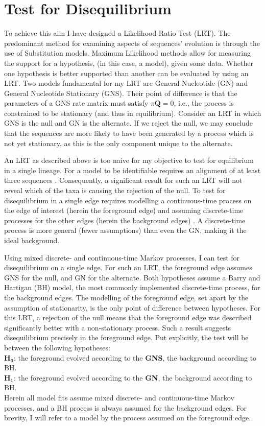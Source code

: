 
\chapter{Test for Disequilibrium}

To achieve this aim I have designed a Likelihood Ratio Test (LRT). The predominant method for examining aspects of sequences' evolution is through the use of \glspl{Substitution model}. \Gls{Maximum Likelihood} methods allow for measuring the support for a hypothesis, (in this case, a \gls{model}), given some data. Whether one hypothesis is better supported than another can be evaluated by using an LRT. Two models fundamental for my LRT are General Nucleotide (GN) and General Nucleotide Stationary (GNS). Their point of difference is that the parameters of a GNS rate matrix must satisfy $\pi\mathbf{Q}=0$, i.e., the process is constrained to be stationary (and thus in equilibrium). Consider an LRT in which GNS is the null and GN is the alternate. If we reject the null, we may conclude that the sequences are more likely to have been generated by a process which is not yet stationary, as this is the only component unique to the alternate.

An LRT as described above is too naive for my objective to test for equilibrium in a single lineage. For a model to be \gls{identifiable} requires an alignment of at least three sequences \cite{Chang1996FullConsistency}. Consequently, a significant result for such an LRT will not reveal which of the taxa is causing the rejection of the null. To test for disequilibrium in a single \gls{edge} requires  modelling a continuous-time process on the edge of interest (herein the foreground edge) and assuming discrete-time processes for the other edges (herein the background edges) \cite{Verbyla2013TheSubstitution}. A discrete-time process is more general (fewer assumptions) than even the GN, making it the ideal background. 

Using mixed discrete- and continuous-time Markov processes, I can test for disequilibrium on a single edge. For such an LRT, the foreground edge assumes GNS for the null, and GN for the alternate. Both hypotheses assume a Barry and Hartigan (BH) model, the most commonly implemented discrete-time process, for the background edges. The modelling of the foreground edge, set apart by the assumption of stationarity, is the only point of difference between hypotheses. For this LRT, a rejection of the null means that the foreground edge was described significantly better with a non-stationary process. Such a result suggests disequilibrium precisely in the foreground edge. Put explicitly, the test will be between the following hypotheses:\\ $\mathbf{H_0}$: the foreground evolved according to the \textbf{GNS}, the background according to BH. \\ $\mathbf{H_1}$: the foreground evolved according to the \textbf{GN}, the background according to BH.\\
\noindent Herein all model fits assume mixed discrete- and continuous-time Markov processes, and a BH process is always assumed for the background edges. For brevity, I will refer to a model by the process assumed on the foreground edge.

